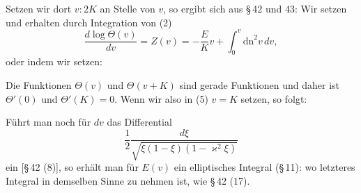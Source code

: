 Setzen wir dort $v:2K$ an Stelle von $v$, so ergibt sich aus §\,42 und 43:
Wir setzen
und erhalten durch Integration von (2)
\[ \frac{d\log\Theta(v)}{dv} = Z(v) = -\frac{E}{K}v+\int_0^v \mathrm{dn}^2v\,dv, \]
oder indem wir
setzen:

Die Funktionen $\Theta(v)$ und $\Theta(v+K)$ sind gerade Funktionen und daher ist $\Theta'(0)$
und $\Theta'(K) = 0$. Wenn wir also in (5) $v=K$ setzen, so folgt:

Führt man noch für $dv$ das Differential
\[ \frac{1}{2}\frac{d\xi}{\sqrt{\xi(1-\xi)(1-\varkappa^2\xi)}} \]
ein [§\,42 (8)], so erhält man für $E(v)$ ein elliptisches Integral  (§\,11):
wo letzteres Integral in demselben Sinne zu nehmen ist, wie §\,42 (17).
